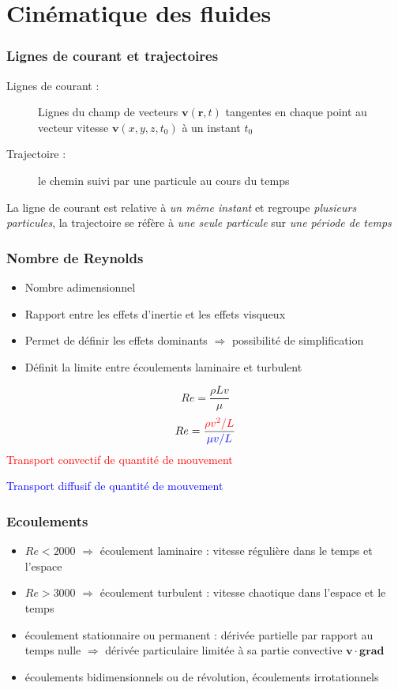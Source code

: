 \documentclass[%
	final, %
	 10pt, %
 	compress, %
hyperref={bookmarks=true}	
]{beamer}
\renewcommand{\v}[1]{\ensuremath{\bm{#1}}} %
\newcommand{\grad}[1]{\bm{grad} \, {#1}}
\begin{document}
\section{Cinématique des fluides}
\label{sec:cinem-des-fluid}

\begin{frame}\frametitle{Lignes de courant et trajectoires}
\begin{description}
\item [Lignes de courant :] Lignes du champ de vecteurs $\v{v}(\v{r},
  t)$ tangentes en chaque point au vecteur vitesse
  $\v{v}(x,y,z,t_{0})$ à un instant $t_{0}$
\item[Trajectoire :] le chemin suivi par une particule au cours du temps 
\end{description}
La ligne de courant est relative à \emph{un même instant} et regroupe
\emph{plusieurs particules}, la trajectoire se réfère à \emph{une seule particule}
sur \emph{une période de temps}
\end{frame}

\begin{frame}\frametitle{Nombre de Reynolds}
\begin{itemize}
\item Nombre adimensionnel
\item Rapport entre les effets d'inertie et les effets visqueux
\item Permet de définir les effets dominants $\Rightarrow$ possibilité
  de simplification
\item Définit la limite entre écoulements laminaire et turbulent
\end{itemize}
\begin{dmath*}
Re = \dfrac{\rho L v}{\mu} 
\end{dmath*}
\begin{dmath*}
Re = \dfrac{\textcolor{red}{\rho v^{2} / L}}{\textcolor{blue}{\mu v /L}}
\end{dmath*}
\textcolor{red}{Transport convectif de quantité de mouvement}

\textcolor{blue}{Transport diffusif de quantité de mouvement}
\end{frame}


\begin{frame}\frametitle{Ecoulements}
\begin{itemize}
\item $Re < 2000$ $\Rightarrow$ écoulement laminaire : vitesse
  régulière dans le temps et l'espace
\item $Re > 3000$ $\Rightarrow$ écoulement turbulent : vitesse
  chaotique dans l'espace et le temps
\item écoulement stationnaire ou permanent : dérivée partielle par
  rapport au temps nulle $\Rightarrow$ dérivée particulaire limitée à
  sa partie convective $\v{v} \cdot \grad{ }$
\item écoulements bidimensionnels ou de révolution, écoulements irrotationnels
\end{itemize}
\end{frame}
\end{document}

